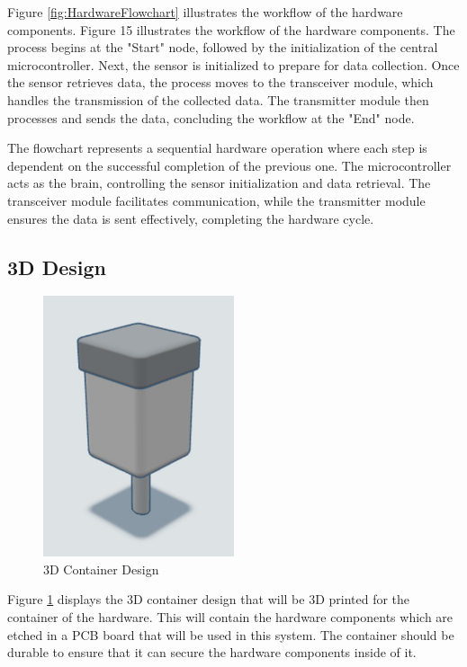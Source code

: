 {	Figure \ref{fig:HardwareFlowchart} illustrates the workflow of the hardware components. Figure 15 illustrates the workflow of the hardware components. The process begins at the "Start" node, followed by the initialization of the central microcontroller. Next, the sensor is initialized to prepare for data collection. Once the sensor retrieves data, the process moves to the transceiver module, which handles the transmission of the collected data. The transmitter module then processes and sends the data, concluding the workflow at the "End" node.
	
	The flowchart represents a sequential hardware operation where each step is dependent on the successful completion of the previous one. The microcontroller acts as the brain, controlling the sensor initialization and data retrieval. The transceiver module facilitates communication, while the transmitter module ensures the data is sent effectively, completing the hardware cycle.
	
	\subsection{3D Design}
	\begin{figure}[H]
		\centering
		\caption{3D Container Design}
		\label{fig:3D}
		\includegraphics[width=0.5\textwidth]{figures/3D.pdf}
	\end{figure}
	
	Figure \ref{fig:3D} displays the 3D container design that will be 3D printed for the container of the hardware. This will contain the hardware components which are etched in a PCB board that will be used in this system. The container should be durable to ensure that it can secure the hardware components inside of it.
	
}
